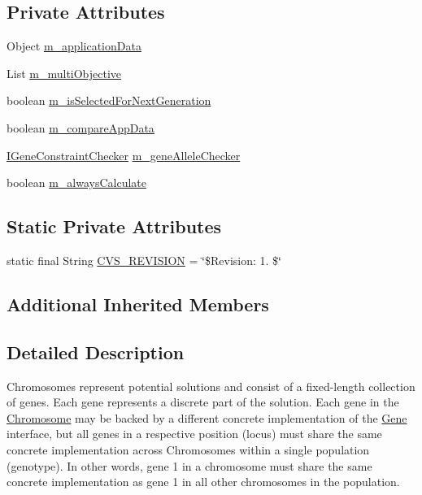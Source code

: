 \subsection*{Private Attributes}
\begin{DoxyCompactItemize}
\item 
Object \hyperlink{classorg_1_1jgap_1_1_chromosome_af2b4e1abcdf5995b45fb7d5cf93a559c}{m\-\_\-application\-Data}
\item 
List \hyperlink{classorg_1_1jgap_1_1_chromosome_a6d73c5e40fce0219e80021211d4a2d57}{m\-\_\-multi\-Objective}
\item 
boolean \hyperlink{classorg_1_1jgap_1_1_chromosome_ad8bb6734b245d112a8e6d66fb38914c9}{m\-\_\-is\-Selected\-For\-Next\-Generation}
\item 
boolean \hyperlink{classorg_1_1jgap_1_1_chromosome_a7c696f550a4f4458ed4115833abf02fb}{m\-\_\-compare\-App\-Data}
\item 
\hyperlink{interfaceorg_1_1jgap_1_1_i_gene_constraint_checker}{I\-Gene\-Constraint\-Checker} \hyperlink{classorg_1_1jgap_1_1_chromosome_af890b1160c9b97defdf107e6a4e53329}{m\-\_\-gene\-Allele\-Checker}
\item 
boolean \hyperlink{classorg_1_1jgap_1_1_chromosome_a678ed92a2a1a47343638de24f40b66e3}{m\-\_\-always\-Calculate}
\end{DoxyCompactItemize}
\subsection*{Static Private Attributes}
\begin{DoxyCompactItemize}
\item 
static final String \hyperlink{classorg_1_1jgap_1_1_chromosome_aa8e104e9bc3f5f2bfdfe67b604c10d9c}{C\-V\-S\-\_\-\-R\-E\-V\-I\-S\-I\-O\-N} = \char`\"{}\$Revision\-: 1. \$\char`\"{}
\end{DoxyCompactItemize}
\subsection*{Additional Inherited Members}


\subsection{Detailed Description}
Chromosomes represent potential solutions and consist of a fixed-\/length collection of genes. Each gene represents a discrete part of the solution. Each gene in the \hyperlink{classorg_1_1jgap_1_1_chromosome}{Chromosome} may be backed by a different concrete implementation of the \hyperlink{interfaceorg_1_1jgap_1_1_gene}{Gene} interface, but all genes in a respective position (locus) must share the same concrete implementation across Chromosomes within a single population (genotype). In other words, gene 1 in a chromosome must share the same concrete implementation as gene 1 in all other chromosomes in the population.

